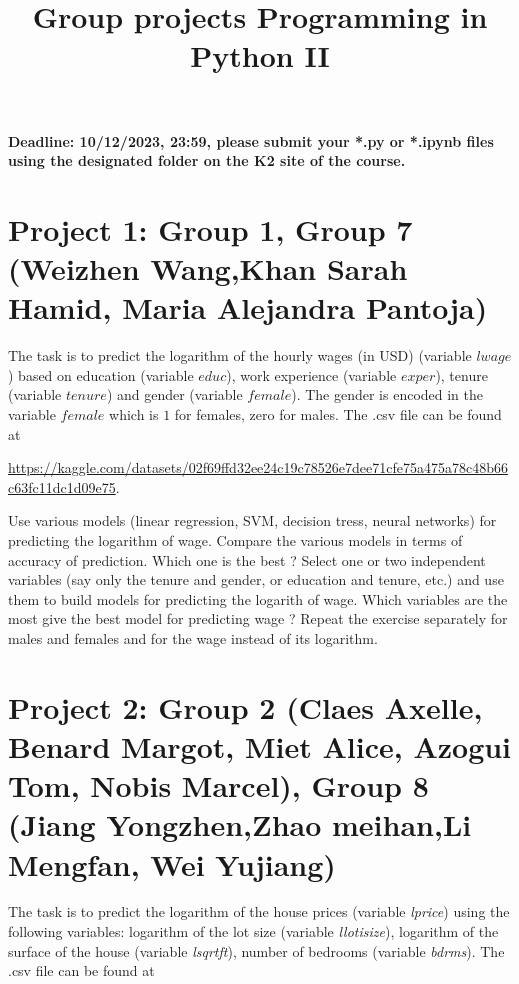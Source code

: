 \documentclass{article}
\title{Group projects Programming in Python II}
\author{}
\date{}
\begin{document}
\maketitle

\textbf{Deadline: 10/12/2023, 23:59,  please submit your *.py or *.ipynb files using the designated folder on the K2 site of the course.}


\section*{Project 1: Group 1,
Group 7 (Weizhen Wang,Khan Sarah Hamid, Maria Alejandra Pantoja) }

  The task is to  predict the logarithm of the hourly wages (in USD) (variable $lwage$) based on education (variable $educ$), work experience (variable $exper$), tenure (variable $tenure$) and gender (variable $female$). The gender is encoded in the variable $female$ which is $1$ for   females, zero for males. 
 The .csv file can be found at 
 
 \url{https://kaggle.com/datasets/02f69ffd32ee24c19c78526e7dee71cfe75a475a78c48b66c63fc11dc1d09e75}. 

 Use various models (linear regression, SVM, decision tress, neural networks) for predicting the logarithm of  wage. Compare the various models in terms of accuracy of prediction. Which one is the best ? 
 Select one or two independent variables (say only the tenure and gender, or education and tenure, etc.)  and use them to build models for predicting the logarith of wage. Which variables are the most
 give the best model for predicting  wage ? Repeat the exercise separately for males and females and for the wage instead of its logarithm. 




\section*{Project 2:  Group 2 (Claes Axelle, Benard Margot, Miet Alice, Azogui Tom,
Nobis Marcel), Group 8  (Jiang Yongzhen,Zhao meihan,Li Mengfan, Wei Yujiang)}

  The task is to predict the logarithm of the house prices (variable \emph{lprice}) using the following variables:
  logarithm of the lot size (variable \emph{llotisize}), logarithm of the surface of the house (variable \emph{lsqrtft}), number of bedrooms (variable \emph{bdrms}). 	
   The .csv file can be found at
\end{document}
